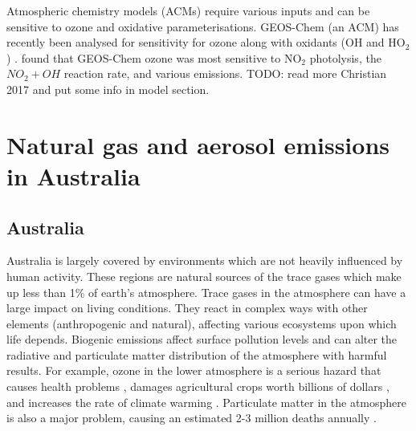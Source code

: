     Atmospheric chemistry models (ACMs) require various inputs and can be sensitive to ozone and oxidative parameterisations. 
    GEOS-Chem (an ACM) has recently been analysed for sensitivity for ozone along with oxidants (OH and HO$_2$) \citep{Christian2017}.
    \cite{Christian2017} found that GEOS-Chem ozone was most sensitive to NO$_2$ photolysis, the $NO_2 + OH$ reaction rate, and various emissions.
    TODO: read more Christian 2017 and put some info in model section.
\section{Natural gas and aerosol emissions in Australia}
\label{ch_LitRev:sec:emissions}

  \subsection{Australia}

    Australia is largely covered by environments which are not heavily influenced by human activity.
    These regions are natural sources of the trace gases which make up less than 1\% of earth's atmosphere.
    Trace gases in the atmosphere can have a large impact on living conditions.
    They react in complex ways with other elements (anthropogenic and natural), affecting various ecosystems upon which life depends.
    Biogenic emissions affect surface pollution levels and can alter the radiative and particulate matter distribution of the atmosphere with harmful results.
    For example, ozone in the lower atmosphere is a serious hazard that causes health problems \citep{Hsieh2013}, damages agricultural crops worth billions of dollars \citep{Avnery2011}, and increases the rate of climate warming \citep{IPCC_2013_chap8}.
    Particulate matter in the atmosphere is also a major problem, causing an estimated 2-3 million deaths annually \citep{Hoek2013, Krewski2009, Silva2013, Lelieveld2015}. 

